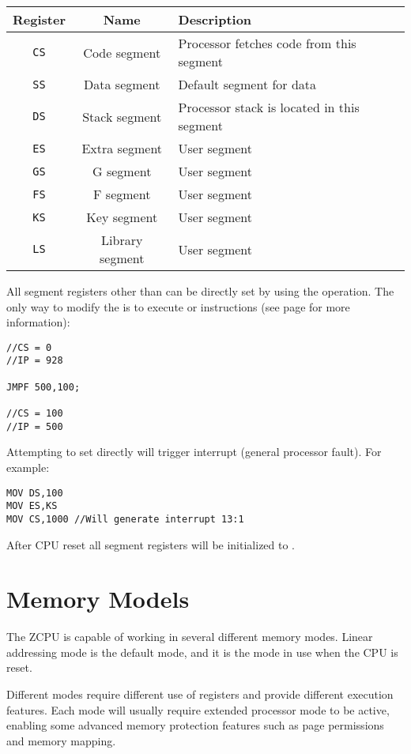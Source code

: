 \singlespacing
\begin{longtable}{|c|c|p{3.0in}|} \hline
Register & Name & Description \\ \hline
\texttt{CS} & Code segment    & Processor fetches code from this segment \\ \hline
\texttt{SS} & Data segment    & Default segment for data \\ \hline
\texttt{DS} & Stack segment   & Processor stack is located in this segment \\ \hline
\texttt{ES} & Extra segment   & User segment \\ \hline
\texttt{GS} & G segment       & User segment \\ \hline
\texttt{FS} & F segment       & User segment \\ \hline
\texttt{KS} & Key segment     & User segment \\ \hline
\texttt{LS} & Library segment & User segment \\ \hline
\end{longtable}
\onehalfspacing

All segment registers other than  can be directly set by using the  operation. The only way to modify the  is to execute  or  instructions (see page \pageref{branching} for more information):
\begin{verbatim}
//CS = 0
//IP = 928

JMPF 500,100;

//CS = 100
//IP = 500
\end{verbatim}

Attempting to set  directly will trigger interrupt  (general processor fault). For example:
\begin{verbatim}
MOV DS,100
MOV ES,KS
MOV CS,1000 //Will generate interrupt 13:1
\end{verbatim}

After CPU reset all segment registers will be initialized to .

\section{Memory Models}
The ZCPU is capable of working in several different memory modes. Linear addressing mode is the default mode, and it is the mode in use when the CPU is reset.

Different modes require different use of registers and provide different execution features. Each mode will usually require extended processor mode to be active, enabling some advanced memory protection features such as page permissions and memory mapping.

